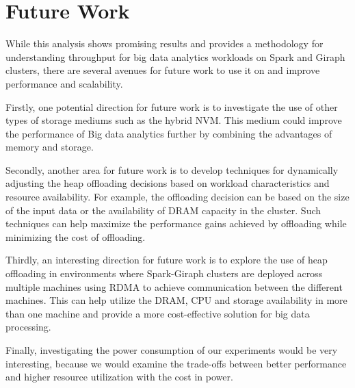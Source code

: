 \section{Future Work}

While this analysis shows promising results and provides a methodology for understanding
throughput for big data analytics workloads on Spark and Giraph
clusters, there are several avenues for future work to use it on and
improve performance and scalability.

Firstly, one potential direction for future work is to investigate the
use of other types of storage mediums such as the hybrid NVM. This
medium could improve the performance of Big data analytics further by
combining the advantages of memory and storage.

Secondly, another area for future work is to develop techniques for
dynamically adjusting the heap offloading decisions based on workload
characteristics and resource availability. For example, the offloading
decision can be based on the size of the input data or the
availability of DRAM capacity in the cluster. Such techniques can help
maximize the performance gains achieved by offloading while minimizing
the cost of offloading.

Thirdly, an interesting direction for future work is to explore the
use of heap offloading in environments where Spark-Giraph clusters are
deployed across multiple machines using RDMA to achieve communication
between the different machines. This can help utilize the DRAM, CPU
and storage availability in more than one machine and provide a more
cost-effective solution for big data processing.

Finally, investigating the power consumption of our experiments would be
very interesting, because we would examine the trade-offs between
better performance and higher resource utilization with the cost in power.

